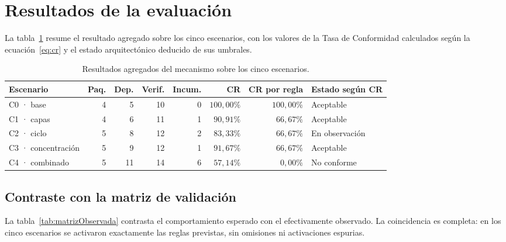 \section{Resultados de la evaluación}
\label{sec:resultados}
La tabla~\ref{tab:resultados} resume el resultado agregado sobre los cinco escenarios, con los valores de la Tasa de Conformidad calculados según la ecuación~\ref{eq:cr} y el estado arquitectónico deducido de sus umbrales.

\begin{table}[H]
\centering
\caption{Resultados agregados del mecanismo sobre los cinco escenarios.}
\label{tab:resultados}
\footnotesize
\begin{tabular}{lrrrrrrl}
\toprule
\textbf{Escenario} & \textbf{Paq.} & \textbf{Dep.} & \textbf{Verif.} & \textbf{Incum.} & \textbf{CR} & \textbf{CR por regla} & \textbf{Estado según CR} \\
\midrule
C0 · base            & 4 & 5  & 10 & 0 & $100{,}00\%$ & $100{,}00\%$ & Aceptable \\
C1 · capas           & 4 & 6  & 11 & 1 & $90{,}91\%$  & $66{,}67\%$ & Aceptable \\
C2 · ciclo           & 5 & 8  & 12 & 2 & $83{,}33\%$  & $66{,}67\%$ & En observación \\
C3 · concentración   & 5 & 9  & 12 & 1 & $91{,}67\%$  & $66{,}67\%$ & Aceptable \\
C4 · combinado       & 5 & 11 & 14 & 6 & $57{,}14\%$  & $0{,}00\%$ & No conforme \\
\bottomrule
\end{tabular}
\end{table}

\subsection{Contraste con la matriz de validación}
La tabla~\ref{tab:matrizObservada} contrasta el comportamiento esperado con el efectivamente observado. La coincidencia es completa: en los cinco escenarios se activaron exactamente las reglas previstas, sin omisiones ni activaciones espurias.

